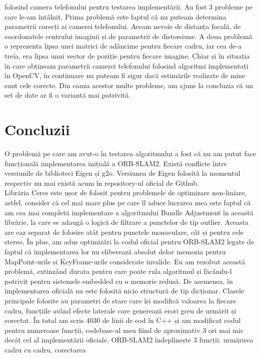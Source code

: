 \documentclass[12pt,a4paper]{report}
\begin{document}
folosind camera telefonului pentru testarea implementării. Au fost 3 probleme pe care le-am 
întâlnit. Prima problemă este faptul că nu puteam determina parametrii corecți ai camerei telefonului. Aveam nevoie 
de distanța focală, de coordonatele centrului imaginii și de parametrii de distorsiune.
A doua problemă o reprezenta lipsa unei matrici de adâncime pentru fiecare cadru, iar cea de-a
treia, era lipsa unui vector de poziție pentru fiecare imagine. Chiar 
și în situația în care obțineam parametrii camerei telefonului folosind algoritmi implementați
în OpenCV, în continuare nu puteam fi sigur dacă estimările realizate de mine sunt cele corecte.
Din cauza acestor multe probleme, am ajuns la concluzia că un set de date ar fi o variantă mai potrivită.

\chapter{Concluzii}
O problemă pe care am avut-o în testarea algoritmului a fost că nu am putut face 
funcțională implementarea inițială a ORB-SLAM2. Există conflicte între versiunile de
biblioteci Eigen și g2o. Versiunea de Eigen folosită la momentul respectiv nu mai 
există acum în repository-ul oficial de Github.\\ 
Librăria Ceres este ușor de folosit pentru problemele de optimizare non-liniare, astfel,
consider că cel mai mare plus pe care îl aduce lucrarea mea este faptul că am cea mai 
completă implementare a algoritmului Bundle Adjustment în această librărie, la 
care se adaugă o logică de filtrare a punctelor de tip outlier. Aceasta are caz 
separat de folosire atât pentru punctele monoculare, cât și pentru cele stereo.   
În plus, am adus optimizări la codul oficial pentru ORB-SLAM2 legate de faptul că implementarea lor 
nu eliberează absolut deloc memoria pentru MapPoint-urile și KeyFrame-urile 
considerate invalide. Eu am rezolvat această problemă, extinzând durata pentru 
care poate rula algoritmul și făcându-l potrivit pentru sistemele embedded cu o memorie redusă.
De asemenea, în implementarea oficială nu este folosită nicio structură de tip
dicționar. Clasele principale folosite au parametri de stare care își modifică
valoarea la fiecare cadru, funcțiile având efecte laterale care generează erori 
greu de urmărit și corectat. În total am scris 4030 de linii de cod în C++ și 
am modificat codul pentru numeroase funcții, codebase-ul meu fiind de aproximativ 3 ori 
mai mic decât cel al implementării oficiale.  ORB-SLAM2 îndeplinește 3 funcții: urmărirea 
cadru cu cadru, corectarea 
\end{document}
